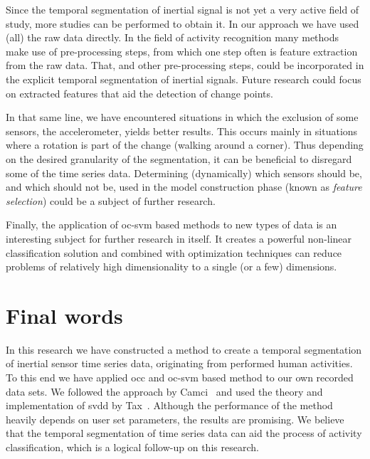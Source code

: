 Since the temporal segmentation of inertial signal is not yet a very active field of study, more studies can be performed to obtain it.
In our approach we have used (all) the raw data directly.
In the field of activity recognition many methods make use of pre-processing steps, from which one step often is feature extraction from the raw data.
That, and other pre-processing steps, could be incorporated in the explicit temporal segmentation of inertial signals.
Future research could focus on extracted features that aid the detection of change points.

In that same line, we have encountered situations in which the exclusion of some sensors, \eg the accelerometer, yields better results.
This occurs mainly in situations where a rotation is part of the change (\eg walking around a corner).
Thus depending on the desired granularity of the segmentation, it can be beneficial to disregard some of the time series data.
Determining (dynamically) which sensors should be, and which should not be, used in the model construction phase (known as \emph{feature selection}) could be a subject of further research.

Finally, the application of \gls{oc-svm} based methods to new types of data is an interesting subject for further research in itself.
It creates a powerful non-linear classification solution and combined with optimization techniques can reduce problems of relatively high dimensionality to a single (or a few) dimensions.

\section{Final words}\label{sec:final_remarks}
In this research we have constructed a method to create a temporal segmentation of inertial sensor time series data, originating from performed human activities.
To this end we have applied \gls{occ} and \gls{oc-svm} based method to our own recorded data sets.
We followed the approach by Camci~\cite{camci2010change} and used the theory and implementation of \gls{svdd} by Tax~\cite{tax2001one,Ddtools2013}.
Although the performance of the method heavily depends on user set parameters, the results are promising.
We believe that the temporal segmentation of time series data can aid the process of activity classification, which is a logical follow-up on this research.

